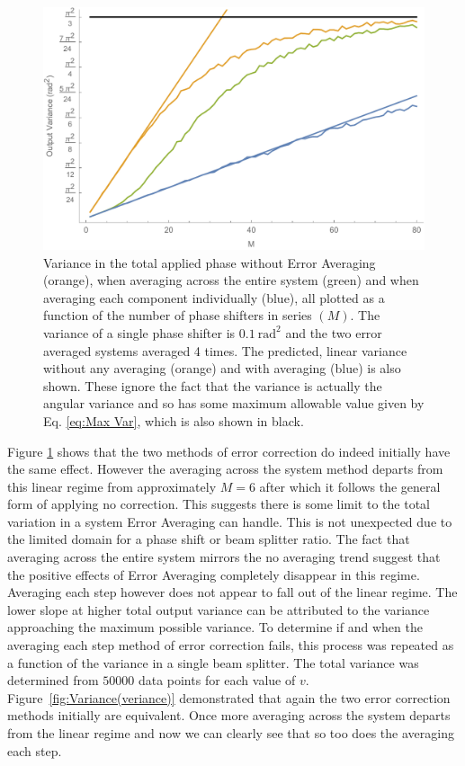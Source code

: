 \documentclass[aps,pra,twocolumn,superscriptaddress,numerical,floatfix]{revtex4-1}
\begin{document}
\begin{figure}
\centerline{\includegraphics[width=\columnwidth]{phase_all.pdf}}
\caption{Variance in the total applied phase without Error Averaging (orange), when averaging across the entire system (green) and when averaging each component individually (blue), all plotted as a function of the number of phase shifters in series $(M)$. The variance of a single phase shifter is $0.1\ \textrm{rad}^{2}$ and the two error averaged systems averaged 4 times. The predicted, linear variance without any averaging (orange) and with averaging (blue) is also shown. These ignore the fact that the variance is actually the angular variance and so has some maximum allowable value given by Eq. \ref{eq:Max Var}, which is also shown in black. \label{fig:Variance-in-phase all}}
\end{figure}
%
Figure \ref{fig:Variance-in-phase all} shows that the two methods of error correction do indeed initially have the same effect. However the averaging across the system method departs from this linear regime from approximately $M=6$ after which it follows the general form of applying no correction. This suggests there is some limit to the total variation in a system Error Averaging can handle. This is not unexpected due to the limited domain for a phase shift or beam splitter ratio. The fact that averaging across the entire system mirrors the no averaging trend suggest that the positive effects of Error Averaging completely disappear in this regime. Averaging each step however does not appear to fall out of the linear regime. The lower slope at higher total output variance can be attributed to the variance approaching the maximum possible variance.  To determine if and when the averaging each step method of error correction fails, this process was repeated as a function of the variance in a single beam splitter. The total variance was determined from $50000$ data points for each value of $v$. Figure~\ref{fig:Variance(veriance)} demonstrated that again the two error correction methods initially are equivalent. Once more averaging across the system departs from the linear regime and now we can clearly see that so too does the averaging each step.
\end{document}
